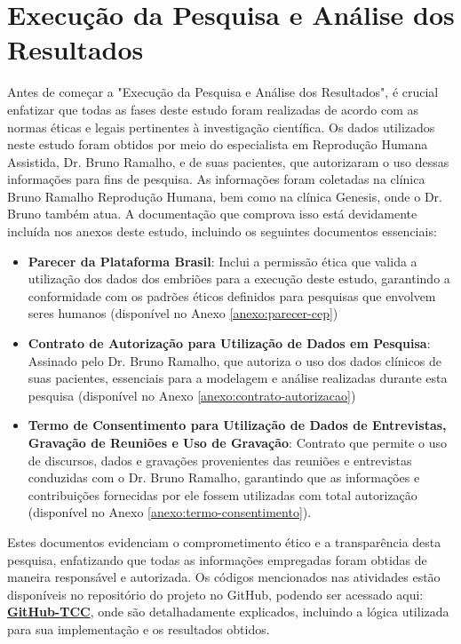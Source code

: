 
\chapter[Execução da Pesquisa e Análise dos Resultados]{Execução da Pesquisa e Análise dos Resultados} 

Antes de começar a "Execução da Pesquisa e Análise dos Resultados", é crucial enfatizar que todas as fases deste estudo foram realizadas de acordo com as normas éticas e legais pertinentes à investigação científica. Os dados utilizados neste estudo foram obtidos por meio do especialista em Reprodução Humana Assistida, Dr. Bruno Ramalho, e de suas pacientes, que autorizaram o uso dessas informações para fins de pesquisa. As informações foram coletadas na clínica Bruno Ramalho Reprodução Humana, bem como na clínica Genesis, onde o Dr. Bruno também atua. A documentação que comprova isso está devidamente incluída nos anexos deste estudo, incluindo os seguintes documentos essenciais:
\begin{itemize}
  \item \textbf{Parecer da Plataforma Brasil}: Inclui a permissão ética que valida a utilização dos dados dos embriões para a execução deste estudo, garantindo a conformidade com os padrões éticos definidos para pesquisas que envolvem seres humanos (disponível no Anexo \ref{anexo:parecer-cep})
  \item \textbf{Contrato de Autorização para Utilização de Dados em Pesquisa}: Assinado pelo Dr. Bruno Ramalho, que autoriza o uso dos dados clínicos de suas pacientes, essenciais para a modelagem e análise realizadas durante esta pesquisa (disponível no Anexo \ref{anexo:contrato-autorizacao})
  \item \textbf{Termo de Consentimento para Utilização de Dados de Entrevistas, Gravação de Reuniões e Uso de Gravação}: Contrato que permite o uso de discursos, dados e gravações provenientes das reuniões e entrevistas conduzidas com o Dr. Bruno Ramalho, garantindo que as informações e contribuições fornecidas por ele fossem utilizadas com total autorização (disponível no Anexo \ref{anexo:termo-consentimento}).
\end{itemize}
Estes documentos evidenciam o comprometimento ético e a transparência desta pesquisa, enfatizando que todas as informações empregadas foram obtidas de maneira responsável e autorizada.
Os códigos mencionados nas atividades estão disponíveis no repositório do projeto no GitHub, podendo ser acessado aqui: \textbf{\href{https://github.com/sabrinaberno/TCC1}{GitHub-TCC}}, onde são detalhadamente explicados, incluindo a lógica utilizada para sua implementação e os resultados obtidos.
 
